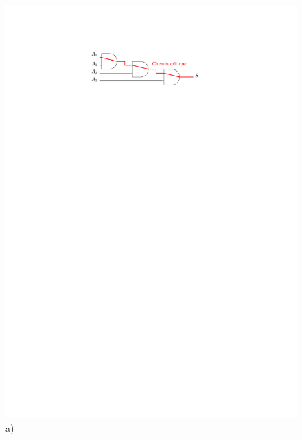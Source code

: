 \begin{figure}[htbp]
   \begin{minipage}[c]{.46\linewidth}
\includegraphics[width=\columnwidth]{Figs/and_4e_cascade_critique.pdf} \\\centering a)
   \end{minipage} \hfill
   \begin{minipage}[c]{.36\linewidth}

\end{minipage}
\end{figure}
